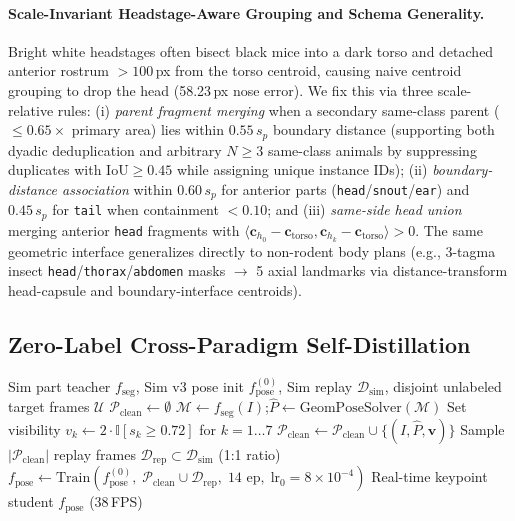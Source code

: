 \documentclass[10pt,twocolumn,letterpaper]{article}
\begin{document}
\paragraph{Scale-Invariant Headstage-Aware Grouping and Schema Generality.} Bright white headstages often bisect black mice into a dark torso and detached anterior rostrum $>100$\,px from the torso centroid, causing naive centroid grouping to drop the head (58.23\,px nose error). We fix this via three scale-relative rules: (i) \emph{parent fragment merging} when a secondary same-class parent ($\le 0.65\times$ primary area) lies within $0.55\,s_p$ boundary distance (supporting both dyadic deduplication and arbitrary $N\ge 3$ same-class animals by suppressing duplicates with $\mathrm{IoU}\ge 0.45$ while assigning unique instance IDs); (ii) \emph{boundary-distance association} within $0.60\,s_p$ for anterior parts (\texttt{head}/\texttt{snout}/\texttt{ear}) and $0.45\,s_p$ for \texttt{tail} when containment $<0.10$; and (iii) \emph{same-side head union} merging anterior \texttt{head} fragments with $\langle \mathbf{c}_{h_0}-\mathbf{c}_{\text{torso}}, \mathbf{c}_{h_k}-\mathbf{c}_{\text{torso}}\rangle > 0$. The same geometric interface generalizes directly to non-rodent body plans (e.g., 3-tagma insect \texttt{head}/\texttt{thorax}/\texttt{abdomen} masks $\to$ 5 axial landmarks via distance-transform head-capsule and boundary-interface centroids).

\subsection{Zero-Label Cross-Paradigm Self-Distillation}
\label{sec:distill}

\begin{algorithm}[t]
\caption{\textbf{Parts2Points-Distill} (Zero Real Labels, 38\,FPS)}
\label{alg:p2p}
\footnotesize
\begin{algorithmic}[1]
\REQUIRE Sim part teacher $f_{\text{seg}}$, Sim v3 pose init $f_{\text{pose}}^{(0)}$, Sim replay $\mathcal{D}_{\text{sim}}$, disjoint unlabeled target frames $\mathcal{U}$
\STATE $\mathcal{P}_{\text{clean}} \leftarrow \emptyset$
  \STATE $\mathcal{M} \leftarrow f_{\text{seg}}(I)$;\quad $\hat{P} \leftarrow \mathrm{GeomPoseSolver}(\mathcal{M})$
    \STATE Set visibility $v_k \leftarrow 2\cdot\mathbb{I}[s_k \ge 0.72]$ for $k=1\dots 7$
    \STATE $\mathcal{P}_{\text{clean}} \leftarrow \mathcal{P}_{\text{clean}} \cup \{(I, \hat{P}, \mathbf{v})\}$
  \ENDIF
\ENDFOR
\STATE Sample $|\mathcal{P}_{\text{clean}}|$ replay frames $\mathcal{D}_{\text{rep}} \subset \mathcal{D}_{\text{sim}}$ (1:1 ratio)
\STATE $f_{\text{pose}} \leftarrow \mathrm{Train}(f_{\text{pose}}^{(0)},\; \mathcal{P}_{\text{clean}} \cup \mathcal{D}_{\text{rep}},\; \text{14 ep},\; \text{lr}_0=8\times 10^{-4})$
\RETURN Real-time keypoint student $f_{\text{pose}}$ (38\,FPS)
\end{algorithmic}
\end{algorithm}
\end{document}
